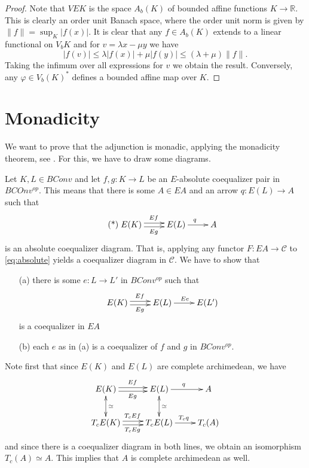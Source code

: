 \documentclass[12pt]{article}
\begin{document}
\begin{proof} Note that $VEK$ is the space $A_b(K)$ of bounded affine functions $K\to \mathbb R$. This is clearly an order unit Banach space, where the order unit norm is given by $\|f\|=\sup_K|f(x)|$. It is clear that any $f\in A_b(K)$ 
extends to a linear functional on $V_bK$ and for $v=\lambda x-\mu y$ we have
\[
|f(v)|\le \lambda|f(x)|+\mu|f(y)|\le (\lambda+\mu)\|f\|.
\]
Taking the infimum over all expressions for $v$ we obtain the result. Conversely, any $\varphi\in V_b(K)^*$ defines a 
 bounded affine map over $K$.

\end{proof}

\section{Monadicity}

We want to prove that the adjunction is monadic, applying the monadicity theorem, see \cite{leinster}. For this, we have to draw some diagrams.

Let $K,L\in BConv$ and let $f,g:K\to L$ be an $E$-absolute coequalizer pair in $BCOnv^{op}$. This means that there is some $A\in EA$ and an arrow $q:E(L)\to A$ such that
\begin{equation}\label{eq:absolute}\tag{*}
\xymatrix{
E(K) \ar@<.5ex>[r]^{Ef} \ar@<-.5ex>[r]_{Eg} &E(L)\ar[r]^q & A}
\end{equation}
is an absolute coequalizer diagram. That is, applying any functor $F: EA\to \mathcal C$ to \eqref{eq:absolute} yields a coequalizer diagram in $\mathcal C$. We have to show that
\begin{enumerate}
\item[(a)] there is some $e: L\to L'$ in $BConv^{op}$ such that 
\begin{equation}
\xymatrix{
E(K) \ar@<.5ex>[r]^{Ef} \ar@<-.5ex>[r]_{Eg} &E(L)\ar[r]^{Ee} & E(L')}
\end{equation}
is a coequalizer in $EA$
\item[(b)] each $e$ as in (a) is a coequalizer of $f$ and $g$ in $BConv^{op}$.
\end{enumerate}

Note first that since $E(K)$ and $E(L)$ are complete archimedean, we have 
\[
\xymatrix{
E(K) \ar@<.5ex>[r]^{Ef} \ar@<-.5ex>[r]_{Eg} \ar@{<->}^{\simeq}[d]&E(L)\ar[r]^q \ar@{<->}^\simeq[d]& A\\
T_cE(K)\ar@<.5ex>[r]^{T_cEf} \ar@<-.5ex>[r]_{T_cEg} &T_cE(L)\ar[r]^{T_cq}& T_c(A) }
\]
and since there is a coequalizer diagram in both lines, we obtain an isomorphism $T_c(A)\simeq A$. This implies that 
 $A$ is complete archimedean as well.
\end{document}
